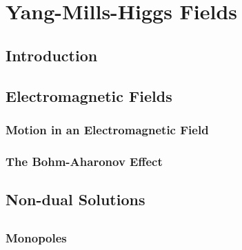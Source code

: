 \chapter{Yang-Mills-Higgs Fields}

\section{Introduction}

\section{Electromagnetic Fields}

\subsection{Motion in an Electromagnetic Field}

\subsection{The Bohm-Aharonov Effect}

\section{Non-dual Solutions}

\section{}

\subsection{Monopoles}


